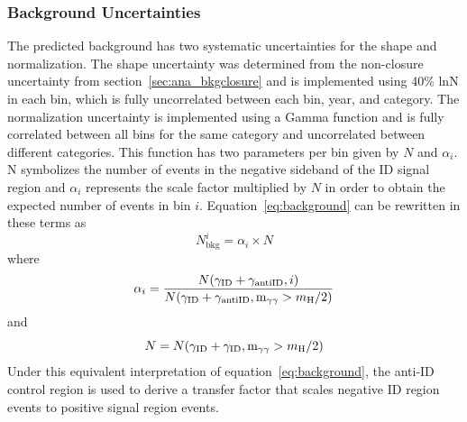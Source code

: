 \subsubsection{Background Uncertainties} \label{sec:ana_systs_bkg}
The predicted background has two systematic uncertainties for the shape and normalization. The shape uncertainty was determined from the non-closure uncertainty from section~\ref{sec:ana_bkgclosure} and is implemented using 40\% lnN in each bin, which is fully uncorrelated between each bin, year, and category. The normalization uncertainty is implemented using a Gamma function and is fully correlated between all bins for the same category and uncorrelated between different categories. This function has two parameters per bin given by $N$ and $\alpha_i$. N symbolizes the number of events in the negative \lxy sideband of the ID signal region and $\alpha_i$ represents the scale factor multiplied by $N$ in order to obtain the expected number of events in bin $i$. Equation~\ref{eq:background} can be rewritten in these terms as
\begin{equation}
	N_\text{bkg}^i=\alpha_i\times N
\end{equation}
where
\begin{equation}
	\alpha_i=\frac{N(\gamma_\mathrm{ID}+\gamma_\mathrm{antiID}, i)}{N(\gamma_\mathrm{ID}+\gamma_\mathrm{antiID}, \text{m}_{\gamma\gamma} > m_{\mathrm{H}}\space/2)}
\end{equation}
and
\begin{equation}
	N=N(\gamma_\mathrm{ID}+\gamma_\mathrm{ID}, \text{m}_{\gamma\gamma} > m_{\mathrm{H}}\space/2)
\end{equation}
Under this equivalent interpretation of equation~\ref{eq:background}, the anti-ID control region is used to derive a transfer factor that scales negative \lxy ID region events to positive \lxy signal region events.

